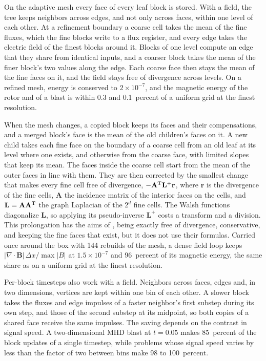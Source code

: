 \documentclass[twocolumn]{aastex701}
\begin{document}
On the adaptive mesh every face of every leaf block is stored. With a field, the tree keeps neighbors across edges, and not only across faces, within one level of each other. At a refinement boundary a coarse cell takes the mean of the fine fluxes, which the fine blocks write to a flux register, and every edge takes the electric field of the finest blocks around it. Blocks of one level compute an edge that they share from identical inputs, and a coarser block takes the mean of the finer block's two values along the edge. Each coarse face then stays the mean of the fine faces on it, and the field stays free of divergence across levels. On a refined mesh, energy is conserved to $2\times10^{-7}$, and the magnetic energy of the rotor and of a blast is within 0.3 and 0.1~percent of a uniform grid at the finest resolution.

When the mesh changes, a copied block keeps its faces and their compensations, and a merged block's face is the mean of the old children's faces on it. A new child takes each fine face on the boundary of a coarse cell from an old leaf at its level where one exists, and otherwise from the coarse face, with limited slopes that keep its mean. The faces inside the coarse cell start from the mean of the outer faces in line with them. They are then corrected by the smallest change that makes every fine cell free of divergence, $-\mathbf{A}^{\rm T}\mathbf{L}^{+}\mathbf{r}$, where $\mathbf{r}$ is the divergence of the fine cells, $\mathbf{A}$ the incidence matrix of the interior faces on the cells, and $\mathbf{L} = \mathbf{A}\mathbf{A}^{\rm T}$ the graph Laplacian of the $2^d$ fine cells. The Walsh functions diagonalize $\mathbf{L}$, so applying its pseudo-inverse $\mathbf{L}^{+}$ costs a transform and a division. This prolongation has the aims of \citet{TothRoe2002}, being exactly free of divergence, conservative, and keeping the fine faces that exist, but it does not use their formulas. Carried once around the box with 144 rebuilds of the mesh, a dense field loop keeps $|\nabla\cdot\mathbf{B}|\,\Delta x/\max|B|$ at $1.5\times10^{-7}$ and 96~percent of its magnetic energy, the same share as on a uniform grid at the finest resolution.

Per-block timesteps also work with a field. Neighbors across faces, edges and, in two dimensions, vertices are kept within one bin of each other. A slower block takes the fluxes and edge impulses of a faster neighbor's first substep during its own step, and those of the second substep at its midpoint, so both copies of a shared face receive the same impulses. The saving depends on the contrast in signal speed. A two-dimensional MHD blast at $t = 0.05$ makes 85~percent of the block updates of a single timestep, while problems whose signal speed varies by less than the factor of two between bins make 98 to 100~percent.
\end{document}
